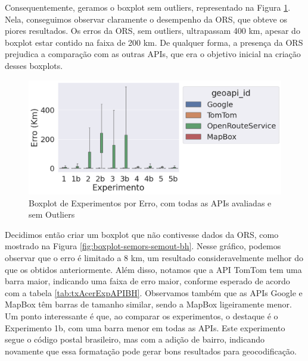 Consequentemente, geramos o boxplot sem outliers, representado na Figura \ref{fig:boxplot-semout-bh}. Nela, conseguimos observar claramente o desempenho da ORS, que obteve os piores resultados. Os erros da ORS, sem outliers, ultrapassam 400 km, apesar do boxplot estar contido na faixa de 200 km. De qualquer forma, a presença da ORS prejudica a comparação com as outras APIs, que era o objetivo inicial na criação desses boxplots.

\begin{figure}[h]
    \centering
    \includegraphics[width=\textwidth]{Figuras/boxplotExperimentoSemOut.png}
    \caption{Boxplot de Experimentos por Erro, com todas as APIs avaliadas e sem Outliers}
    \label{fig:boxplot-semout-bh}
\end{figure}


Decidimos então criar um boxplot que não contivesse dados da ORS, como mostrado na Figura \ref{fig:boxplot-semors-semout-bh}. Nesse gráfico, podemos observar que o erro é limitado a 8 km, um resultado consideravelmente melhor do que os obtidos anteriormente. Além disso, notamos que a API TomTom tem uma barra maior, indicando uma faixa de erro maior, conforme esperado de acordo com a tabela \ref{tab:txAcerExpAPIBH}. Observamos também que as APIs Google e MapBox têm barras de tamanho similar, sendo a MapBox ligeiramente menor. Um ponto interessante é que, ao comparar os experimentos, o destaque é o Experimento 1b, com uma barra menor em todas as APIs. Este experimento segue o código postal brasileiro, mas com a adição de bairro, indicando novamente que essa formatação pode gerar bons resultados para geocodificação.
  
